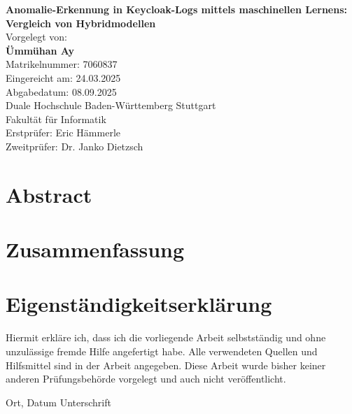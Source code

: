 \documentclass[a4paper,12pt]{article}
\begin{document}
	\thispagestyle{empty}
	
	\begin{center}
		\vspace*{2cm}

		\Huge\textbf{Anomalie-Erkennung in Keycloak-Logs mittels maschinellen Lernens: Vergleich von Hybridmodellen} \\[1.5cm]
		
		\normalsize
		Vorgelegt von: \\[0.3cm]
		\textbf{Ümmühan Ay} \\
		Matrikelnummer: 7060837 \\[1cm]
		
		Eingereicht am: 24.03.2025 \\[0.3cm]
		Abgabedatum: 08.09.2025 \\[1cm]
		
		Duale Hochschule Baden-Württemberg Stuttgart\\
		Fakultät für Informatik \\[2cm]
		
		Erstprüfer: Eric Hämmerle \\
		Zweitprüfer: Dr. Janko Dietzsch
		
	\end{center}
	
	\newpage
	\section*{Abstract}
	
	\newpage
	\section*{Zusammenfassung}
	
	\newpage
	\section*{Eigenständigkeitserklärung}
	
	Hiermit erkläre ich, dass ich die vorliegende Arbeit selbstständig und ohne unzulässige fremde Hilfe angefertigt habe.  
	Alle verwendeten Quellen und Hilfsmittel sind in der Arbeit angegeben.  
	Diese Arbeit wurde bisher keiner anderen Prüfungsbehörde vorgelegt und auch nicht veröffentlicht.
	
	\vspace{2cm}
	
	\noindent Ort, Datum \hfill Unterschrift
	\newpage
	\tableofcontents
	\newpage
	\listoffigures
	\newpage
	\listoftables
	\newpage
	
\end{document}
